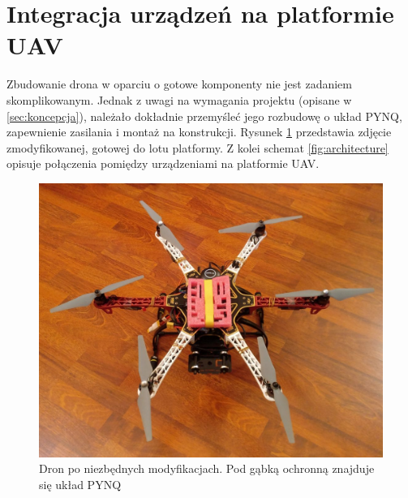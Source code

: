 \section{Integracja urządzeń na platformie UAV} 

Zbudowanie drona w oparciu o gotowe komponenty nie jest zadaniem skomplikowanym. 
Jednak z uwagi na wymagania projektu (opisane w \ref{sec:koncepcja}), należało dokładnie przemyśleć jego rozbudowę o układ PYNQ, zapewnienie zasilania i montaż na konstrukcji.  %
Rysunek \ref{fig:drone_photo} przedstawia zdjęcie zmodyfikowanej, gotowej do lotu platformy.
Z kolei schemat \ref{fig:architecture} opisuje połączenia pomiędzy urządzeniami na platformie UAV.
\begin{figure}[h]
	\centering
	\captionsetup{justification=centering,margin=1cm}
	\hspace*{0cm}
	\includegraphics[width=14cm]{5_drone_photo.jpg}
	\caption{Dron po niezbędnych modyfikacjach. Pod gąbką ochronną znajduje się układ PYNQ}
	\label{fig:drone_photo}
\end{figure}
